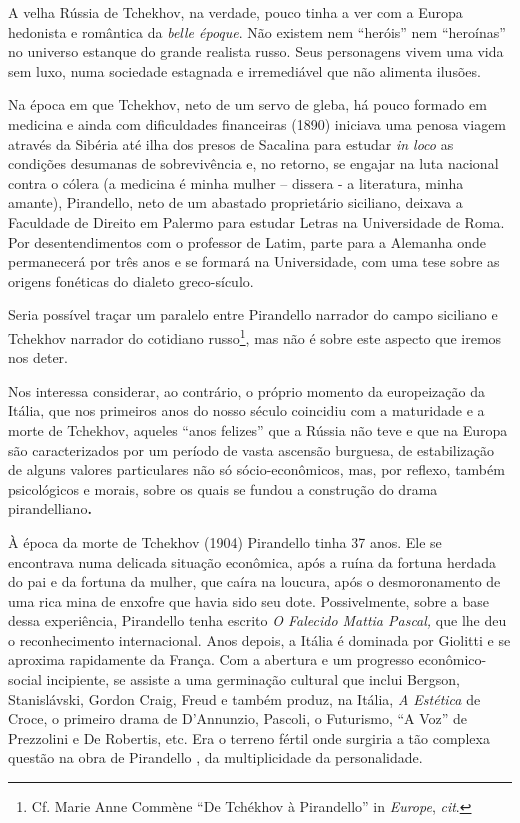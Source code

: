 A velha Rússia de Tchekhov, na verdade, pouco tinha a ver com a Europa
hedonista e romântica da \emph{belle époque}. Não existem nem ``heróis''
nem ``heroínas'' no universo estanque do grande realista russo. Seus
personagens vivem uma vida sem luxo, numa sociedade estagnada e
irremediável que não alimenta ilusões.

Na época em que Tchekhov, neto de um servo de gleba, há pouco formado em
medicina e ainda com dificuldades financeiras (1890) iniciava uma penosa
viagem através da Sibéria até ilha dos presos de Sacalina para estudar
\emph{in loco} as condições desumanas de sobrevivência e, no retorno, se
engajar na luta nacional contra o cólera (a medicina é minha mulher --
dissera - a literatura, minha amante), Pirandello, neto de um abastado
proprietário siciliano, deixava a Faculdade de Direito em Palermo para
estudar Letras na Universidade de Roma. Por desentendimentos com o
professor de Latim, parte para a Alemanha onde permanecerá por três anos
e se formará na Universidade, com uma tese sobre as origens fonéticas do
dialeto greco-sículo.

Seria possível traçar um paralelo entre Pirandello narrador do campo
siciliano e Tchekhov narrador do cotidiano russo\footnote{Cf. Marie Anne
  Commène ``De Tchékhov à Pirandello'' in \emph{Europe}, \emph{cit}.},
mas não é sobre este aspecto que iremos nos deter.

Nos interessa considerar, ao contrário, o próprio momento da
europeização da Itália, que nos primeiros anos do nosso século coincidiu
com a maturidade e a morte de Tchekhov, aqueles ``anos felizes'' que a
Rússia não teve e que na Europa são caracterizados por um período de
vasta ascensão burguesa, de estabilização de alguns valores particulares
não só sócio-econômicos, mas, por reflexo, também psicológicos e morais,
sobre os quais se fundou a construção do drama pirandelliano\textbf{. }

À época da morte de Tchekhov (1904) Pirandello tinha 37 anos. Ele se
encontrava numa delicada situação econômica, após a ruína da fortuna
herdada do pai e da fortuna da mulher, que caíra na loucura, após o
desmoronamento de uma rica mina de enxofre que havia sido seu dote.
Possivelmente, sobre a base dessa experiência, Pirandello tenha escrito
\emph{O Falecido Mattia Pascal,} que lhe deu o reconhecimento
internacional. Anos depois, a Itália é dominada por Giolitti e se
aproxima rapidamente da França. Com a abertura e um progresso
econômico-social incipiente, se assiste a uma germinação cultural que
inclui Bergson, Stanislávski, Gordon Craig, Freud e também produz, na
Itália, \emph{A Estética} de Croce, o primeiro drama de D'Annunzio,
Pascoli, o Futurismo, ``A Voz'' de Prezzolini e De Robertis, etc. Era o
terreno fértil onde surgiria a tão complexa questão na obra de
Pirandello , da multiplicidade da personalidade.

